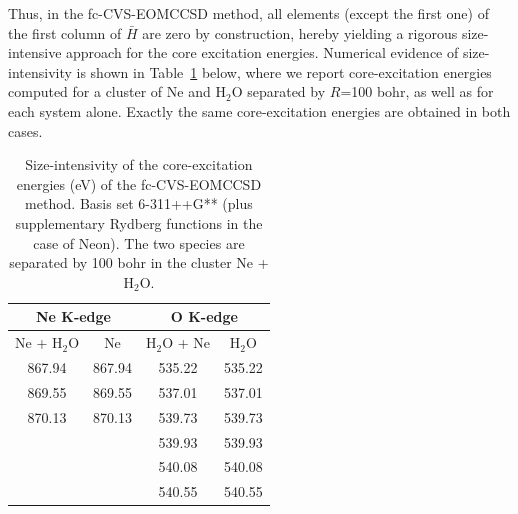 \documentclass[journal=jctcce,manuscript=article]{achemso}
\begin{document}
Thus, in the fc-CVS-EOMCCSD method,
all elements (except the first one) of the first column of $\bar H$ are zero by construction,
hereby yielding a rigorous size-intensive approach for the core excitation energies.
%
Numerical evidence of size-intensivity is shown in Table~\ref{Table:intensivity} below, 
where we report core-excitation energies computed for a cluster of
Ne and H$_2$O separated by $R$=100 bohr, as well as for 
each system alone. Exactly the same core-excitation energies are obtained in both cases.
\begin{table}
\caption{Size-intensivity of the core-excitation energies (eV) 
of the fc-CVS-EOMCCSD method. Basis set 6-311++G** (plus supplementary Rydberg functions in the case of Neon). The two species are separated by 100 bohr in the cluster Ne + H$_2$O. 
\label{Table:intensivity}}
\begin{tabular}{cc|cc}
\hline
\multicolumn{2}{c|}{Ne K-edge}
& \multicolumn{2}{c}{O K-edge} \\
       \hline
Ne + H$_2$O  &  Ne  
 & H$_2$O + Ne &  H$_2$O \\
\hline%
867.94 & 867.94 & 535.22 & 535.22 \\
869.55 & 869.55 & 537.01 & 537.01 \\
870.13 & 870.13 & 539.73 & 539.73 \\
& & 539.93 & 539.93 \\
& & 540.08 & 540.08 \\
& & 540.55 & 540.55 \\
\hline
\end{tabular}
\end{table}
\end{document}
